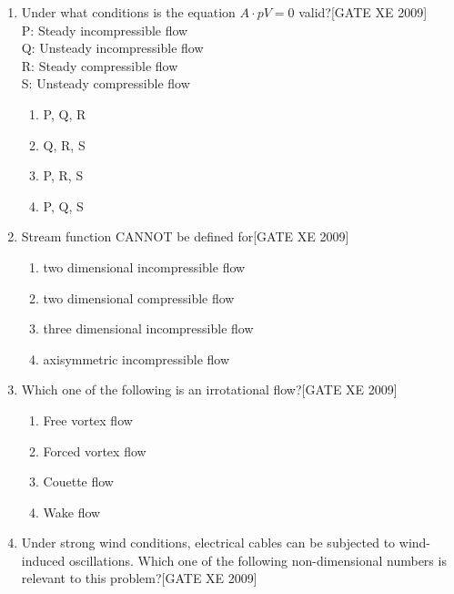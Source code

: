 \documentclass[journal,12pt,onecolumn]{IEEEtran}
\theoremstyle{remark}
\begin{document}
\begin{enumerate}









\item Under what conditions is the equation $A \cdot pV = 0$ valid?\hfill[GATE XE 2009] \\
P: Steady incompressible flow \\
Q: Unsteady incompressible flow \\
R: Steady compressible flow \\
S: Unsteady compressible flow
\begin{multicols}{4}
\begin{enumerate}
    \item  P, Q, R
    \item  Q, R, S
    \item  P, R, S\
    \item  P, Q, S
\end{enumerate}
  \end{multicols}


\item Stream function CANNOT be defined for\hfill[GATE XE 2009]
\begin{multicols}{2}
\begin{enumerate}
    

   \item  two dimensional incompressible flow 
 \item  two dimensional compressible flow 
    \item  three dimensional incompressible flow 
   \item  axisymmetric incompressible flow 
\end{enumerate}
 \end{multicols}

\item Which one of the following is an irrotational flow?\hfill[GATE XE 2009]
\begin{enumerate}
    \item Free vortex flow
    \item Forced vortex flow
    \item Couette flow
    \item Wake flow
\end{enumerate}

\item Under strong wind conditions, electrical cables can be subjected to wind-induced oscillations. Which one of the following non-dimensional numbers is relevant to this problem?\hfill[GATE XE 2009]


\end{enumerate}
\end{document}
